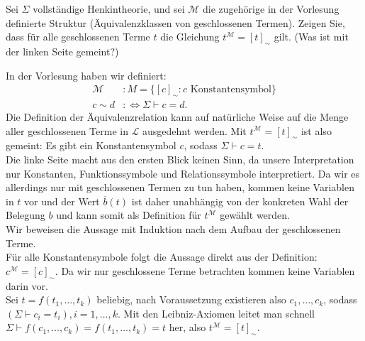 
\begin{exercise}[118]

Sei $\Sigma$ vollständige Henkintheorie, und sei $\mathscr{M}$ die zugehörige
in der Vorlesung definierte Struktur (Äquivalenzklassen von geschlossenen Termen).
Zeigen Sie, dass für alle geschlossenen Terme $t$ die Gleichung $t^{\mathscr{M}} = [t]_{\sim}$
gilt. (Was ist mit der linken Seite gemeint?)

\end{exercise}


\begin{solution}
In der Vorlesung haben wir definiert:
\begin{align*}
  \mathscr{M}&: M = \{[c]_{\sim}: c \text{ Konstantensymbol} \} \\
  c \sim d &:\iff \Sigma \vdash c = d.
\end{align*}
Die Definition der Äquivalenzrelation kann auf natürliche Weise auf die Menge
aller geschlossenen Terme in $\mathscr{L}$ ausgedehnt werden. Mit $t^{\mathscr{M}} = [t]_{\sim}$
ist also gemeint: Es gibt ein Konstantensymbol $c$, sodass $\Sigma \vdash c = t$. \\
Die linke Seite macht aus den ersten Blick keinen Sinn, da unsere Interpretation
nur Konstanten, Funktionssymbole und Relationssymbole interpretiert. Da wir
es allerdings nur mit geschlossenen Termen zu tun haben, kommen keine Variablen in $t$
vor und der Wert $\overline{b}(t)$ ist daher unabhängig von der konkreten Wahl
der Belegung $b$ und kann somit als Definition für $t^{\mathscr{M}}$ gewählt werden. \\
Wir beweisen die Aussage mit Induktion nach dem Aufbau der geschlossenen Terme. \\
Für alle Konstantensymbole folgt die Aussage direkt aus der Definition: $c^{\mathscr{M}} = [c]_{\sim}$.
Da wir nur geschlossene Terme betrachten kommen keine Variablen darin vor. \\
Sei $t = f(t_1,\dots,t_k)$ beliebig, nach Voraussetzung existieren also $c_1,\dots,c_k$, sodass
$(\Sigma \vdash c_i  = t_i), i = 1,\dots,k$. Mit den Leibniz-Axiomen leitet man schnell
$\Sigma \vdash f(c_1,\dots,c_k) = f(t_1,\dots,t_k) = t$ her, also $t^{\mathscr{M}} = [t]_{\sim}$.
\end{solution}


